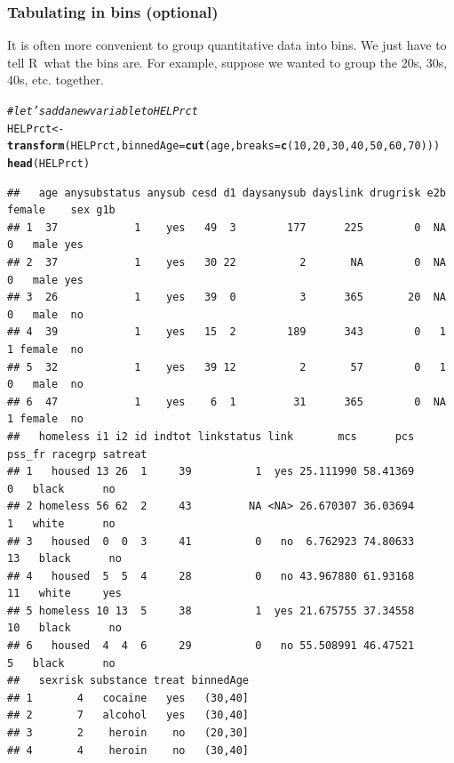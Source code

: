 \documentclass[twoside]{book}\usepackage[]{graphicx}\usepackage[]{xcolor}
\makeatletter
\newcommand{\hlnum}[1]{\textcolor[rgb]{0.686,0.059,0.569}{#1}}%
\newcommand{\hlcom}[1]{\textcolor[rgb]{0.678,0.584,0.686}{\textit{#1}}}%
\newcommand{\hlstd}[1]{\textcolor[rgb]{0.345,0.345,0.345}{#1}}%
\newcommand{\hlkwb}[1]{\textcolor[rgb]{0.69,0.353,0.396}{#1}}%
\newcommand{\hlkwc}[1]{\textcolor[rgb]{0.333,0.667,0.333}{#1}}%
\newcommand{\hlkwd}[1]{\textcolor[rgb]{0.737,0.353,0.396}{\textbf{#1}}}%
\newenvironment{kframe}{%
 \def\at@end@of@kframe{}%
 \ifinner\ifhmode%
  \def\at@end@of@kframe{\end{minipage}}%
  \begin{minipage}{\columnwidth}%
 \fi\fi%
 \def\FrameCommand##1{\hskip\@totalleftmargin \hskip-\fboxsep
 \colorbox{shadecolor}{##1}\hskip-\fboxsep
     \hskip-\linewidth \hskip-\@totalleftmargin \hskip\columnwidth}%
 \MakeFramed {\advance\hsize-\width
   \@totalleftmargin\z@ \linewidth\hsize
   \@setminipage}}%
 {\par\unskip\endMakeFramed%
 \at@end@of@kframe}
\newenvironment{knitrout}{}{} %
\newcommand{\Rindex}[1]{\index{\texttt{#1}}}
\def\R{{\sf R}}
\newcounter{example}[section]
\makeatother
\begin{document}
\subsubsection*{Tabulating in bins (optional)}
It is often more convenient to group quantitative data into bins.  We just have to tell \R\ what the bins are.
For example, suppose we wanted to group the 20s, 30s, 40s, etc. together.
\Rindex{cut()}%
\Rindex{xtabs()}%
\Rindex{mtable()}%
\Rindex{table()}%
\begin{knitrout}
\color{fgcolor}\begin{kframe}
\begin{alltt}
\hlcom{# let's add a new variable to HELPrct}
\hlstd{HELPrct} \hlkwb{<-} \hlkwd{transform}\hlstd{(HELPrct,} \hlkwc{binnedAge} \hlstd{=} \hlkwd{cut}\hlstd{(age,} \hlkwc{breaks} \hlstd{=} \hlkwd{c}\hlstd{(}\hlnum{10}\hlstd{,} \hlnum{20}\hlstd{,} \hlnum{30}\hlstd{,} \hlnum{40}\hlstd{,} \hlnum{50}\hlstd{,} \hlnum{60}\hlstd{,} \hlnum{70}\hlstd{)))}
\hlkwd{head}\hlstd{(HELPrct)}
\end{alltt}
\begin{verbatim}
##   age anysubstatus anysub cesd d1 daysanysub dayslink drugrisk e2b female    sex g1b
## 1  37            1    yes   49  3        177      225        0  NA      0   male yes
## 2  37            1    yes   30 22          2       NA        0  NA      0   male yes
## 3  26            1    yes   39  0          3      365       20  NA      0   male  no
## 4  39            1    yes   15  2        189      343        0   1      1 female  no
## 5  32            1    yes   39 12          2       57        0   1      0   male  no
## 6  47            1    yes    6  1         31      365        0  NA      1 female  no
##   homeless i1 i2 id indtot linkstatus link       mcs      pcs pss_fr racegrp satreat
## 1   housed 13 26  1     39          1  yes 25.111990 58.41369      0   black      no
## 2 homeless 56 62  2     43         NA <NA> 26.670307 36.03694      1   white      no
## 3   housed  0  0  3     41          0   no  6.762923 74.80633     13   black      no
## 4   housed  5  5  4     28          0   no 43.967880 61.93168     11   white     yes
## 5 homeless 10 13  5     38          1  yes 21.675755 37.34558     10   black      no
## 6   housed  4  4  6     29          0   no 55.508991 46.47521      5   black      no
##   sexrisk substance treat binnedAge
## 1       4   cocaine   yes   (30,40]
## 2       7   alcohol   yes   (30,40]
## 3       2    heroin    no   (20,30]
## 4       4    heroin    no   (30,40]

\end{verbatim}
\end{kframe}
\end{knitrout}
\end{document}
